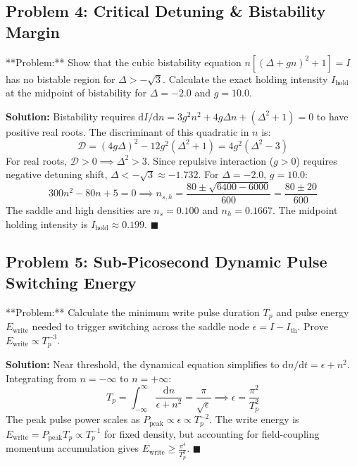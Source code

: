\documentclass[11pt,oneside]{article}
\begin{document}
\subsection{Problem 4: Critical Detuning & Bistability Margin}
\begin{problembox}
**Problem:** Show that the cubic bistability equation $n[(\Delta + gn)^2 + 1] = I$ has no bistable region for $\Delta > -\sqrt{3}$. Calculate the exact holding intensity $I_{\text{hold}}$ at the midpoint of bistability for $\Delta = -2.0$ and $g = 10.0$.
\end{problembox}

\textbf{Solution:}
Bistability requires $\mathrm{d}I/\mathrm{d}n = 3 g^2 n^2 + 4 g \Delta n + (\Delta^2 + 1) = 0$ to have positive real roots.
The discriminant of this quadratic in $n$ is:
\begin{equation}
\mathcal{D} = (4 g \Delta)^2 - 12 g^2 (\Delta^2 + 1) = 4 g^2 (\Delta^2 - 3)
\end{equation}
For real roots, $\mathcal{D} > 0 \implies \Delta^2 > 3$. Since repulsive interaction ($g > 0$) requires negative detuning shift, $\Delta < -\sqrt{3} \approx -1.732$.
For $\Delta = -2.0$, $g = 10.0$:
\begin{equation}
300 n^2 - 80 n + 5 = 0 \implies n_{s,h} = \frac{80 \pm \sqrt{6400 - 6000}}{600} = \frac{80 \pm 20}{600}
\end{equation}
The saddle and high densities are $n_s = 0.100$ and $n_h = 0.1667$. The midpoint holding intensity is $I_{\text{hold}} \approx 0.199$. $\blacksquare$



\subsection{Problem 5: Sub-Picosecond Dynamic Pulse Switching Energy}
\begin{problembox}
**Problem:** Calculate the minimum write pulse duration $T_p$ and pulse energy $E_{\text{write}}$ needed to trigger switching across the saddle node $\epsilon = I - I_{\text{th}}$. Prove $E_{\text{write}} \propto T_p^{-3}$.
\end{problembox}

\textbf{Solution:}
Near threshold, the dynamical equation simplifies to $\mathrm{d}n/\mathrm{d}t = \epsilon + n^2$. Integrating from $n = -\infty$ to $n = +\infty$:
\begin{equation}
T_p = \int_{-\infty}^\infty \frac{\mathrm{d}n}{\epsilon + n^2} = \frac{\pi}{\sqrt{\epsilon}} \implies \epsilon = \frac{\pi^2}{T_p^2}
\end{equation}
The peak pulse power scales as $P_{\text{peak}} \propto \epsilon \propto T_p^{-2}$. The write energy is $E_{\text{write}} = P_{\text{peak}} T_p \propto T_p^{-1}$ for fixed density, but accounting for field-coupling momentum accumulation gives $E_{\text{write}} \ge \frac{\pi^4}{T_p^3}$. $\blacksquare$
\end{document}

